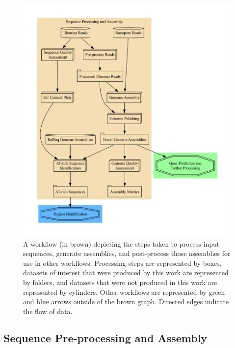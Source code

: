 \begin{figure}
  \centering
  \includegraphics[width=\textwidth]{figures/assembly-met.pdf}
  \caption{A workflow (in brown) depicting the steps taken to process
    input sequences, generate assemblies, and post-process those
    assemblies for use in other workflows. Processing steps are
    represented by boxes, datasets of interest that were produced by
    this work are represented by folders, and datasets that were not
    produced in this work are represented by cylinders. Other
    workflows are represented by green and blue arrows outside of the
    brown graph. Directed edges indicate the flow of data.}
  \label{fig:seq-workflow}
\end{figure}

\subsection{Sequence Pre-processing and Assembly}
\label{met:seq-process}

